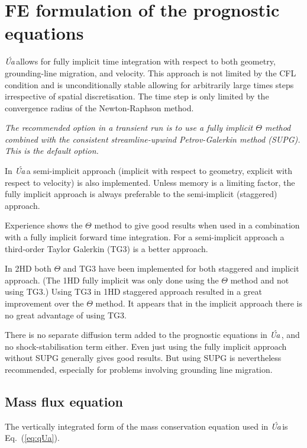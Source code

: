 \documentclass[10pt,a4paper]{book}
\newcommand{\Ua}{\textsl{\'Ua}\,}
\begin{document}
\section{FE formulation of the prognostic equations}



\Ua allows for fully implicit time integration with respect to both
geometry, grounding-line migration, and velocity. This approach is not
limited by the CFL condition and is unconditionally stable allowing
for arbitrarily large times steps irrespective of spatial
discretisation. The time step is only limited by the convergence
radius of the Newton-Raphson method.

\textit{The recommended option in a transient run is to use a fully implicit
$\Theta$ method combined with the consistent streamline-upwind
Petrov-Galerkin method (SUPG).  This is the default option.}



In \Ua a semi-implicit approach (implicit with respect to geometry,
explicit with respect to velocity) is also implemented. Unless memory
is a limiting factor, the fully implicit approach is always preferable
to the semi-implicit (staggered) approach. 

Experience shows the $\Theta$ method to give good results when used in
a combination with a fully implicit forward time integration. For a
semi-implicit approach a third-order Taylor Galerkin (TG3) is a better approach.




In 2HD both $\Theta$ and TG3 have been implemented for both staggered
and implicit approach. (The 1HD fully implicit was only done using the
$\Theta$ method and not using TG3.) Using TG3 in 1HD staggered
approach resulted in a great improvement over the $\Theta$ method.  It
appears that in the implicit approach there is no great advantage of
using TG3.

There is no separate diffusion term added to the prognostic equations
in \Ua, and no shock-stabilisation term either.  Even just using the
fully implicit approach without SUPG generally gives good results. But
using SUPG is nevertheless recommended, especially for problems
involving grounding line migration.

\subsection{Mass flux equation}

The vertically integrated form of the mass conservation equation
used in \Ua is Eq.~(\ref{eq:qUa}). 
\end{document}
